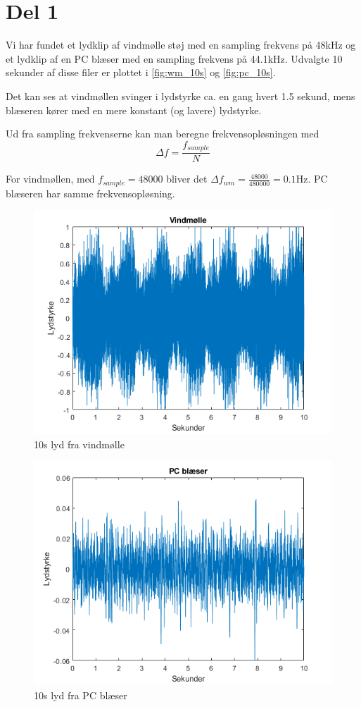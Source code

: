 \section{Del 1}

Vi har fundet et lydklip af vindmølle støj med en sampling frekvens på 48kHz og et lydklip af en PC blæser med en sampling frekvens på 44.1kHz. Udvalgte 10 sekunder af disse filer er plottet i \autoref{fig:wm_10s} og \autoref{fig:pc_10s}.

Det kan ses at vindmøllen svinger i lydstyrke ca. en gang hvert 1.5 sekund, mens blæseren kører med en mere konstant (og lavere) lydstyrke.

Ud fra sampling frekvenserne kan man beregne frekvensopløsningen med 
\begin{equation}
\Delta f = \frac{f_{sample}}{N}
\end{equation}

For vindmøllen, med $f_{sample}=48000$ bliver det $\Delta f_{wm} = \frac{48000}{480000} = 0.1$Hz.
PC blæseren har samme frekvensopløsning.


\begin{figure}[H]
\centering
\includegraphics[width=\textwidth]{"figures/Windmill_10s"}
\caption{10s lyd fra vindmølle}
\label{fig:wm_10s}
\end{figure}

\begin{figure}[H]
\centering
\includegraphics[width=\textwidth]{"figures/pcFan_10s"}
\caption{10s lyd fra PC blæser}
\label{fig:pc_10s}
\end{figure}

